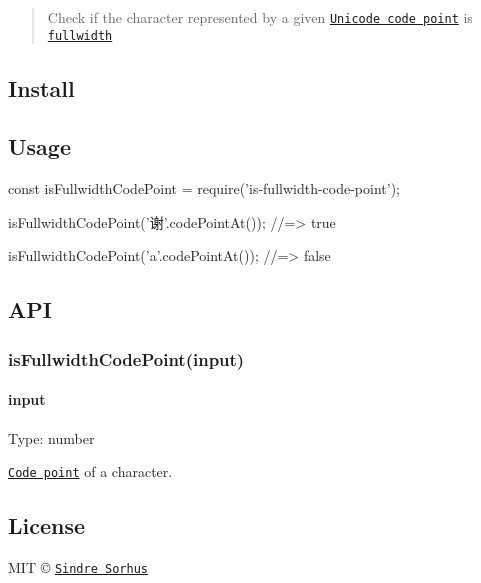 \begin{quote}
Check if the character represented by a given \href{https://en.wikipedia.org/wiki/Code_point}{\tt Unicode code point} is \href{https://en.wikipedia.org/wiki/Halfwidth_and_fullwidth_forms}{\tt fullwidth} \end{quote}


\subsection*{Install}




\subsection*{Usage}


\begin{DoxyCode}
const isFullwidthCodePoint = require('is-fullwidth-code-point');

isFullwidthCodePoint('谢'.codePointAt());
//=> true

isFullwidthCodePoint('a'.codePointAt());
//=> false
\end{DoxyCode}


\subsection*{A\+PI}

\subsubsection*{is\+Fullwidth\+Code\+Point(input)}

\paragraph*{input}

Type\+: {\ttfamily number}

\href{https://en.wikipedia.org/wiki/Code_point}{\tt Code point} of a character.

\subsection*{License}

M\+IT © \href{https://sindresorhus.com}{\tt Sindre Sorhus} 